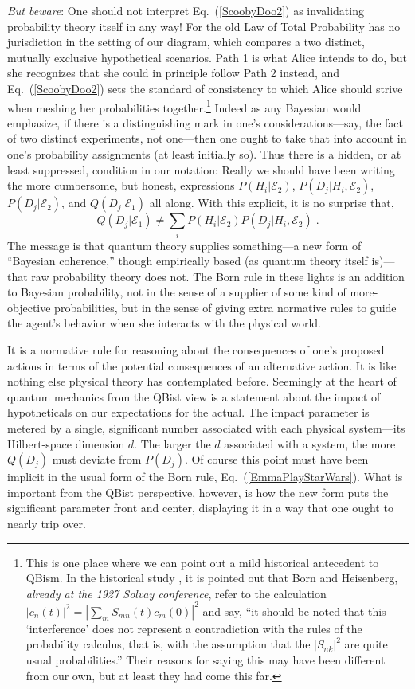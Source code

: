 \documentclass[aps,pra,superscriptaddress,12pt,tightenlines,nofootinbib]{revtex4-2}
\begin{document}
{\it But beware}:  One should not interpret Eq.~(\ref{ScoobyDoo2}) as invalidating probability theory itself in any way!  For the old Law of Total Probability has no jurisdiction in the setting of our diagram, which compares a two distinct, mutually exclusive hypothetical scenarios.  Path 1 is what Alice intends to do, but she recognizes that she could in principle follow Path 2 instead, and Eq.~(\ref{ScoobyDoo2}) sets the standard of consistency to which Alice should strive when meshing her probabilities together.\footnote{This is one place where we can point out a mild historical antecedent to QBism.  In the historical study \cite{Bacciagaluppi09}, it is pointed out that Born and Heisenberg, {\it already at the 1927 Solvay conference}, refer to the calculation $|c_n(t)|^2=\left|\sum_m S_{mn}(t)c_m(0)\right|^2$ and say, ``it should be noted that this `interference' does not represent a contradiction with the rules of the probability calculus, that is, with the assumption that the $|S_{nk}|^2$ are quite usual probabilities.'' Their reasons for saying this may have been different from our own, but at least they had come this far.}  Indeed as any Bayesian would emphasize, if there is a distinguishing mark in one's considerations---say, the fact of two distinct experiments, not one---then one ought to take that into account in one's probability assignments (at least initially so).  Thus there is a hidden, or at least suppressed, condition in our notation:  Really we should have been writing the more cumbersome, but honest, expressions $P(H_i|{\mathcal E}_2)$, $P(D_j|H_i,{\mathcal E}_2)$, $P(D_j|{\mathcal E}_2)$, and $Q(D_j|{\mathcal E}_1)$ all along.  With this explicit, it is no surprise that,
\begin{equation}
Q(D_j|{\mathcal E}_1)\ne\sum_iP(H_i|{\mathcal E}_2)P(D_j|H_i,{\mathcal E}_2)\;.
\end{equation}
The message is that quantum theory supplies some\-thing---a new form of ``Bayesian coherence,'' though empirically based (as quantum theory itself is)---that raw probability theory does not.  The Born rule in these lights is an addition to Bayesian probability, not in the sense of a supplier of some kind of more-objective probabilities, but in the sense of giving extra normative rules to guide the agent's behavior when she interacts with the physical world.

It is a normative rule for reasoning about the consequences of one's proposed actions in terms of the potential consequences of an alternative action.  It is like nothing else physical theory has contemplated before.  Seemingly at the heart of quantum mechanics from the QBist view is a statement about the impact of hypotheticals on our expectations for the actual.  The impact parameter is metered by a single, significant number associated with each physical system---its Hilbert-space dimension $d$.  The larger the $d$ associated with a system, the more $Q(D_j)$ must deviate from $P(D_j)$.  Of course this point must have been implicit in the usual form of the Born rule, Eq.~(\ref{EmmaPlayStarWars}).  What is important from the QBist perspective, however, is how the new form puts the significant parameter front and center, displaying it in a way that one ought to nearly trip over.
\end{document}
